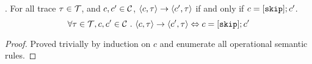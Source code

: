 %
%
\begin{lem}.
	\label{lem:inv_skip}
	For all trace $\mathtt{\tau}\in \mathcal{T}$, and $c, c' \in \mathcal{C}$,  
	$\langle c, \mathtt{\tau} \rangle \rightarrow \langle c', \mathtt{\tau} \rangle$ if and only if $c = [\mathtt{skip}];c'$. 
	\[
		\forall \mathtt{\tau}\in \mathcal{T}, c, c' \in \mathcal{C} ~.~  
		\langle c, \mathtt{\tau} \rangle \rightarrow \langle c', \mathtt{\tau} \rangle
		\Leftrightarrow 
		c = [\mathtt{skip}];c'
	\]
	\end{lem}
\begin{proof}
	Proved trivially by induction on $c$ and enumerate all operational semantic rules.
\end{proof}
%

